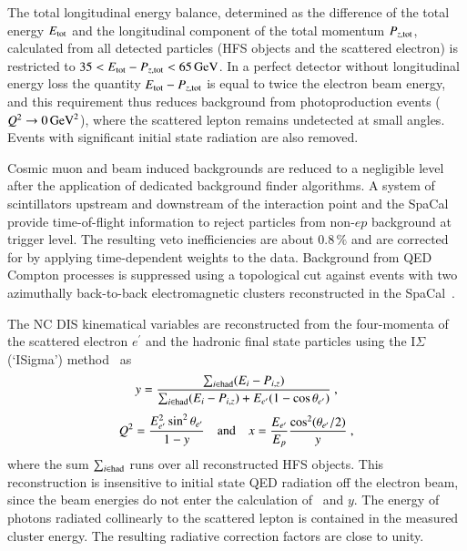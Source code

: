 \documentclass[12pt]{article}
\begin{document}
The total longitudinal energy balance, determined as the difference of the total 
energy $E_{\rm tot}$ and the longitudinal component of the total momentum $P_{z,{\rm tot}}$, 
calculated from all detected particles (HFS objects and the scattered electron) is restricted to  
$35 < E_{\rm tot}-P_{z,{\rm tot}}< 65\,\GeV$.
In a perfect detector without longitudinal energy loss the quantity $ E_{\rm tot}-P_{z,{\rm tot}}$ 
is equal to twice the electron beam energy, and this requirement thus reduces background from 
photoproduction events ($\Qsq\rightarrow 0\,\GeVsq$), where the scattered lepton remains undetected at small angles.
Events with significant initial state radiation are also removed.

Cosmic muon and beam induced backgrounds are reduced
to a negligible level after the application of dedicated background finder algorithms. 
A system of scintillators upstream and downstream of the interaction point and 
the SpaCal provide time-of-flight information to reject particles 
from non-$ep$ background at trigger level.
The resulting veto inefficiencies are about $0.8\,\%$ and are corrected for by applying time-dependent weights to the data.
Background from QED Compton processes is 
suppressed using a topological cut
against events with two azimuthally back-to-back electromagnetic clusters reconstructed
in the SpaCal~\cite{FL}.


The NC DIS kinematical variables are 
reconstructed from the four-momenta of the scattered electron $e^\prime$ and the hadronic final 
state particles using the I$\Sigma$ (`ISigma') method~\cite{sigma_method} as
\begin{equation}
  y = \frac{\sum_{i\in  \rm had}(E_i-P_{i,z})}{\sum_{ i\in \rm had}(E_i-P_{i,z}) + E_{e^\prime}(1-\cos\theta_{e^\prime}) }~, 
\label{eq:Sigma_y}
\end{equation}
\begin{equation}
  \Qsq = \frac{E^2_{e^\prime} \sin^2\theta_{e^\prime} }{1-y}~~~~{\rm and}~~~~
  x = \frac{E_{e^\prime}}{E_p} \frac{\cos^2(\theta_{e^\prime}/2)}{y}~,
\label{eq:ISigma_x}
\end{equation}
where the sum $\sum_{i\in  \rm had}$ runs over all reconstructed HFS objects.
This reconstruction is insensitive to initial state QED radiation off the electron beam, since the beam
energies do not enter the calculation of \Qsq\ and $y$. 
The energy of photons radiated collinearly to the scattered lepton is contained in the measured cluster energy.
The resulting  radiative correction factors are close to unity.
\end{document}
